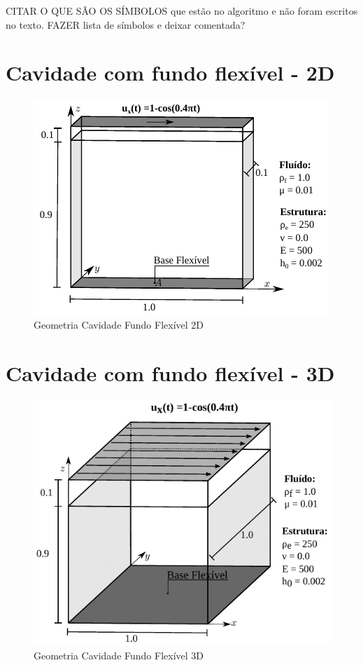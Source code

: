 \documentclass[tese_patricia]{subfiles}
\begin{document}
CITAR O QUE SÃO OS SÍMBOLOS que estão no algoritmo e não foram escritos no texto. FAZER lista de símbolos e deixar comentada?



\section{Cavidade com fundo flexível - 2D}

\begin{figure}[htb!]
	\centering 
	\includegraphics[scale=1.3,trim=0cm 0cm 0cm 0cm, clip=true]{Imagens/Cap7/cav2d.pdf}	
	\caption{Geometria Cavidade Fundo Flexível 2D}
	\label{fig:cavidadeFF2d}
\end{figure}
\section{Cavidade com fundo flexível - 3D}

\begin{figure}[htb!]
	\centering 
	\includegraphics[scale=0.9,trim=0cm 0cm 0cm 0cm, clip=true]{Imagens/Cap7/cav3d.pdf}	
	\caption{Geometria Cavidade Fundo Flexível 3D}
	\label{fig:cavidadeFF3d}
\end{figure}
\end{document}
